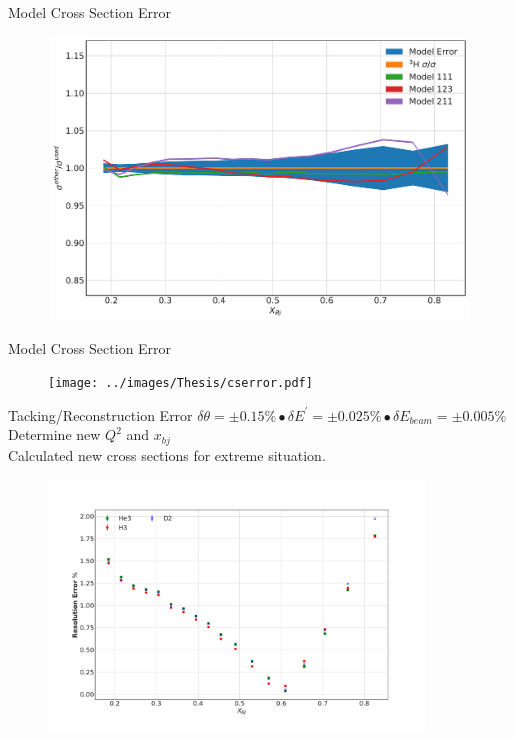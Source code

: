 \documentclass[12pt,usenames,dvipsnames]{beamer}
\begin{document}
\begin{frame}{Model Cross Section Error}
\vspace{-1.cm}
\begin{figure}
\includegraphics[width=12cm,height=7.5cm]{../images/Mod_err.pdf}
\end{figure}
\end{frame}


\begin{frame}{Model Cross Section Error}
\vspace{-1.cm}
\begin{figure}
\texttt{[image: ../images/Thesis/cserror.pdf]}
\end{figure}
\end{frame}

\begin{frame}{Tacking/Reconstruction Error}
	$\delta \theta = \pm 0.15\%  \bullet \delta E^{\prime} = \pm 0.025\% \bullet \delta E_{beam} = \pm 0.005\% $\\
	Determine new $Q^2$ and $x_{bj}$ \\
	Calculated new cross sections for extreme situation.
	

	\begin{figure}
		\includegraphics[width=10cm]{../images/Res_err.pdf}
	\end{figure}
\end{frame}
\end{document}
